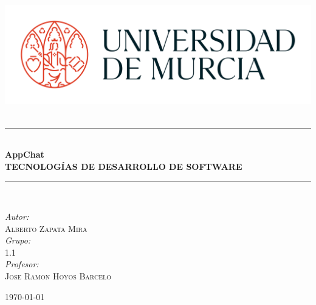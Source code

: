 \begin{titlepage}
    \begin{center}
    
    \includegraphics[width=\textwidth]{images/LogosimboloUMU-positivo.png}\\[1cm]
    
    \textsc{\Large }\\[0.5cm]
    
    \rule{\linewidth}{0.5mm} \\[0.4cm]
    
    {\huge \bfseries AppChat\\[0.2cm]
    TECNOLOGÍAS DE DESARROLLO DE SOFTWARE \\[0.4cm] }
    
    \rule{\linewidth}{0.5mm} \\[1.5cm]
    
    \begin{minipage}{0.4\textwidth}
    \begin{flushleft} \large
    \emph{Autor:}\\
    \textsc{Alberto Zapata Mira}\\
    \vspace{0.5cm}
    \emph{Grupo:}\\
    \textsc{1.1}\\
    \vspace{0.5cm}
    \emph{Profesor:}\\
    \textsc{Jose Ramon Hoyos Barcelo}\\
    \end{flushleft}
    \end{minipage}
    
    \vfill
    
    {\large \today}
    
    \end{center}
    \end{titlepage}